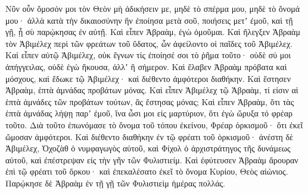 {Νῦν οὖν ὄμοσόν μοι τὸν Θεὸν μὴ ἀδικήσειν με, μηδὲ τὸ σπέρμα μου, μηδὲ τὸ ὄνομά μου· ἀλλὰ κατὰ τὴν δικαιοσύνην ἣν ἐποίησα μετὰ σοῦ, ποιήσεις μετʼ ἐμοῦ, καὶ τῇ γῇ, ᾗ σὺ παρῴκησας ἐν αὐτῇ.
Καὶ εἶπεν Ἁβραὰμ, ἐγὼ ὀμοῦμαι.
Καὶ ἤλεγξεν Ἁβραὰμ τὸν Ἀβιμέλεχ περὶ τῶν φρεάτων τοῦ ὕδατος, ὧν ἀφείλοντο οἱ παῖδες τοῦ Ἀβιμέλεχ.
Καὶ εἶπεν αὐτῷ Ἀβιμέλεχ, οὐκ ἔγνων τίς ἐποίησέ σοι τὸ ῥῆμα τοῦτο· οὐδὲ σύ μοι ἀπήγγειλας, οὐδὲ ἐγὼ ἤκουσα, ἀλλʼ ἢ σήμερον.
Καὶ ἔλαβεν Ἁβραὰμ πρόβατα καὶ μόσχους, καὶ ἔδωκε τῷ Ἀβιμέλεχ· καὶ διέθεντο ἀμφότεροι διαθήκην.
Καὶ ἔστησεν Ἁβραὰμ, ἑπτὰ ἀμνάδας προβάτων μόνας.
Καὶ εἶπεν Ἀβιμέλεχ τῷ Ἁβραὰμ, τί εἰσιν αἱ ἑπτὰ ἀμνάδες τῶν προβάτων τούτων, ἃς ἔστησας μόνας;
Καὶ εἶπεν Ἁβραὰμ, ὅτι τὰς ἑπτὰ ἀμνάδας λήψῃ παρʼ ἐμοῦ, ἵνα ὦσι μοι εἰς μαρτύριον, ὅτι ἐγὼ ὤρυξα τό φρέαρ τοῦτο.
Διὰ τοῦτο ἐπωνόμασε τὸ ὄνομα τοῦ τόπου ἐκείνου, Φρέαρ ὁρκισμοῦ· ὅτι ἐκεῖ ὤμοσαν ἀμφότεροι.
Καὶ διέθεντο διαθήκην ἐν τῷ φρέατι τοῦ ὁρκισμοῦ· ἀνέστη δὲ Ἀβιμέλεχ, Ὁχοζὰθ ὁ νυμφαγωγὸς αὐτοῦ, καὶ Φίχολ ὁ ἀρχιστράτηγος τῆς δυνάμεως αὐτοῦ, καὶ ἐπέστρεψαν εἰς τὴν γῆν τῶν Φυλιστιείμ.
Καὶ ἐφύτευσεν Ἁβραὰμ ἄρουραν ἐπὶ τῷ φρέατι τοῦ ὅρκου· καὶ ἐπεκαλέσατο ἐκεῖ τὸ ὄνομα Κυρίου, Θεὸς αἰώνιος.
Παρῴκησε δὲ Ἁβραὰμ ἐν τῇ γῇ τῶν Φυλιστιεὶμ ἡμέρας πολλάς.

}
